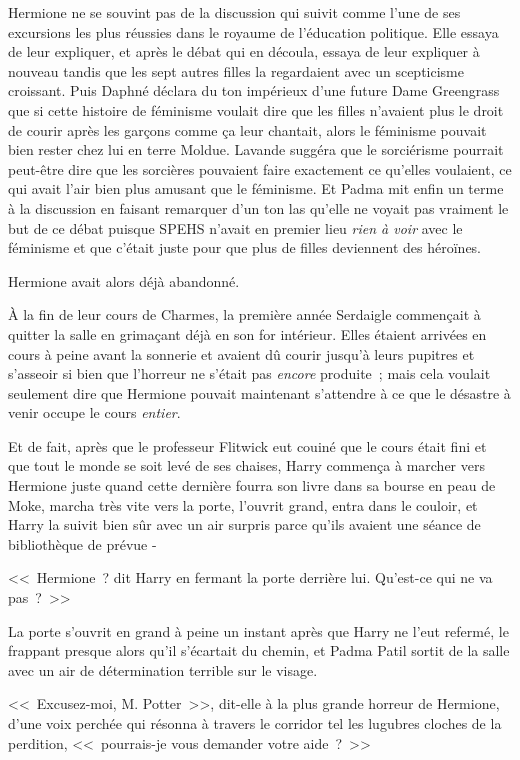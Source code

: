 Hermione ne se souvint pas de la discussion qui suivit comme l'une de ses excursions les plus réussies dans le royaume de l'éducation politique. Elle essaya de leur expliquer, et après le débat qui en découla, essaya de leur expliquer à nouveau tandis que les sept autres filles la regardaient avec un scepticisme croissant. Puis Daphné déclara du ton impérieux d'une future Dame Greengrass que si cette histoire de féminisme voulait dire que les filles n'avaient plus le droit de courir après les garçons comme ça leur chantait, alors le féminisme pouvait bien rester chez lui en terre Moldue. Lavande suggéra que le sorciérisme pourrait peut-être dire que les sorcières pouvaient faire exactement ce qu'elles voulaient, ce qui avait l'air bien plus amusant que le féminisme. Et Padma mit enfin un terme à la discussion en faisant remarquer d'un ton las qu'elle ne voyait pas vraiment le but de ce débat puisque SPEHS n'avait en premier lieu \emph{rien à voir} avec le féminisme et que c'était juste pour que plus de filles deviennent des héroïnes.

Hermione avait alors déjà abandonné.

\later

À la fin de leur cours de Charmes, la première année Serdaigle commençait à quitter la salle en grimaçant déjà en son for intérieur. Elles étaient arrivées en cours à peine avant la sonnerie et avaient dû courir jusqu'à leurs pupitres et s'asseoir si bien que l'horreur ne s'était pas \emph{encore} produite~; mais cela voulait seulement dire que Hermione pouvait maintenant s'attendre à ce que le désastre à venir occupe le cours \emph{entier}.

Et de fait, après que le professeur Flitwick eut couiné que le cours était fini et que tout le monde se soit levé de ses chaises, Harry commença à marcher vers Hermione juste quand cette dernière fourra son livre dans sa bourse en peau de Moke, marcha très vite vers la porte, l'ouvrit grand, entra dans le couloir, et Harry la suivit bien sûr avec un air surpris parce qu'ils avaient une séance de bibliothèque de prévue -

<<~Hermione~? dit Harry en fermant la porte derrière lui. Qu'est-ce qui ne va pas~?~>>

La porte s'ouvrit en grand à peine un instant après que Harry ne l'eut refermé, le frappant presque alors qu'il s'écartait du chemin, et Padma Patil sortit de la salle avec un air de détermination terrible sur le visage.

<<~Excusez-moi, M. Potter~>>, dit-elle à la plus grande horreur de Hermione, d'une voix perchée qui résonna à travers le corridor tel les lugubres cloches de la perdition, <<~pourrais-je vous demander votre aide~?~>>

